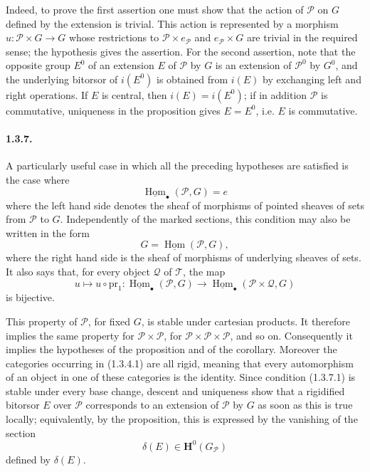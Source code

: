 \documentclass[11pt]{article}
\theoremstyle{plain}
\theoremstyle{definition}
\theoremstyle{remark}
\DeclareMathOperator{\Hom}{Hom}
\begin{document}
Indeed, to prove the first assertion one must show that the action of $\mathcal P$ on $G$ defined by the extension is trivial. This action is represented by a morphism $u:\mathcal P\times G\to G$ whose restrictions to $\mathcal P\times e_{\mathcal P}$ and $e_{\mathcal P}\times G$ are trivial in the required sense; the hypothesis gives the assertion. For the second assertion, note that the opposite group $E^0$ of an extension $E$ of $\mathcal P$ by $G$ is an extension of $\mathcal P^0$ by $G^0$, and the underlying bitorsor of $i(E^0)$ is obtained from $i(E)$ by exchanging left and right operations. If $E$ is central, then $i(E)=i(E^0)$; if in addition $\mathcal P$ is commutative, uniqueness in the proposition gives $E=E^0$, i.e. $E$ is commutative.

\paragraph{1.3.7.} A particularly useful case in which all the preceding hypotheses are satisfied is the case where
\begin{equation}
\underline{\Hom}_{\bullet}(\mathcal P,G)=e
\tag{1.3.7.1}
\end{equation}
where the left hand side denotes the sheaf of morphisms of pointed sheaves of sets from $\mathcal P$ to $G$. Independently of the marked sections, this condition may also be written in the form
\begin{equation}
G=\underline{\Hom}(\mathcal P,G),
\tag{1.3.7.2}
\end{equation}
where the right hand side is the sheaf of morphisms of underlying sheaves of sets. It also says that, for every object $\mathcal Q$ of $\mathcal T$, the map
\begin{equation}
u\longmapsto u\circ\mathrm{pr}_1:
\underline{\Hom}_{\bullet}(\mathcal P,G)
\longrightarrow
\underline{\Hom}_{\bullet}(\mathcal P\times\mathcal Q,G)
\tag{1.3.7.3}
\end{equation}
is bijective.

This property of $\mathcal P$, for fixed $G$, is stable under cartesian products. It therefore implies the same property for $\mathcal P\times\mathcal P$, for $\mathcal P\times\mathcal P\times\mathcal P$, and so on. Consequently it implies the hypotheses of the proposition and of the corollary. Moreover the categories occurring in (1.3.4.1) are all rigid, meaning that every automorphism of an object in one of these categories is the identity. Since condition (1.3.7.1) is stable under every base change, descent and uniqueness show that a rigidified bitorsor $E$ over $\mathcal P$ corresponds to an extension of $\mathcal P$ by $G$ as soon as this is true locally; equivalently, by the proposition, this is expressed by the vanishing of the section
\[
\delta(E)\in \mathbf H^0(G_{\mathcal P})
\]
defined by $\delta(E)$.
\end{document}
